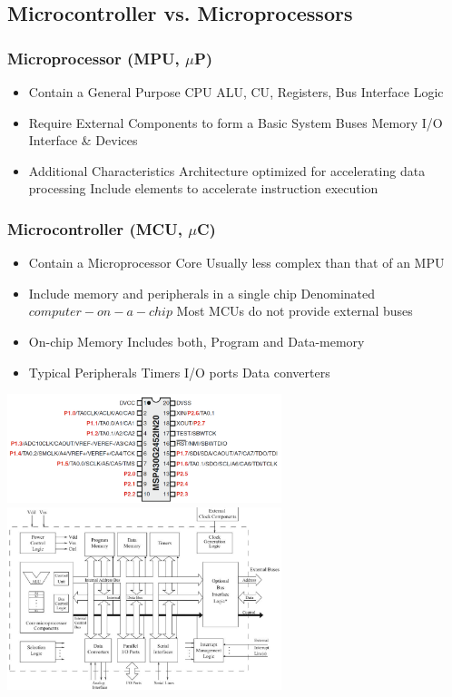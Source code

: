 \subsection{Microcontroller vs. Microprocessors }
\begin{multicols}{2}
		\subsubsection{Microprocessor (\acs{MPU}, $\mu$P) }
		\begin{itemize}
			\item Contain a General Purpose \acs{CPU}
			\subitem \acs{ALU}, \acs{CU}, Registers, Bus Interface Logic
			\item Require External Components to form a Basic System
			\subitem Buses
			\subitem Memory
			\subitem \acs{I/O} Interface \& Devices
			\item Additional Characteristics
			\subitem Architecture optimized for accelerating data processing
			\subitem Include elements to accelerate instruction execution  
		\end{itemize}
\subsubsection{Microcontroller (\acs{MCU},  $\mu$C)}
		\begin{itemize}
			\item Contain a Microprocessor Core
			\subitem Usually less complex than that of an \acs{MPU}
			\item Include memory and peripherals in a single chip
			\subitem Denominated $ computer-on-a-chip $ 
			\subitem Most \acs{MCU}s do not provide external buses
			\item On-chip Memory
			\subitem Includes both, Program and Data-memory
			\item Typical Peripherals
			\subitem Timers
			\subitem \acs{I/O} ports
			\subitem Data converters
		\end{itemize}
\end{multicols}

    \includegraphics[width=8cm]{images/msp430hardware}
	\includegraphics[width=8cm]{images/mCStructure}


